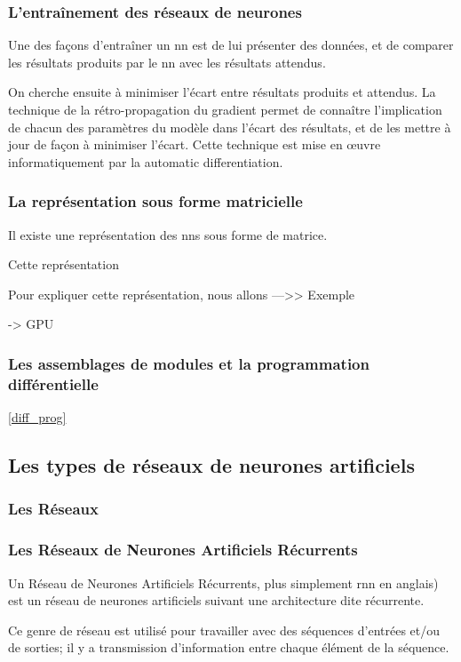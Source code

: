 \subsubsection{L'entraînement des réseaux de neurones}
Une des façons d'entraîner un \gls{nn} est de lui présenter des données, et de comparer les résultats produits par le \gls{nn} avec les résultats attendus.

On cherche ensuite à minimiser l'écart entre résultats produits et attendus.
La technique de la \og rétro-propagation du gradient\fg{} permet de connaître l'implication de chacun des paramètres du modèle dans l'écart des résultats, et de les mettre à jour de façon à minimiser l'écart.
Cette technique est mise en œuvre informatiquement par la \gls{automatic differentiation}. %

\subsubsection{La représentation sous forme matricielle}
\label{def:weight2}
Il existe une représentation des \glspl{nn} sous forme de matrice.

Cette représentation 

Pour expliquer cette représentation, nous allons
 --->> Exemple


-> GPU
\subsubsection{Les assemblages de modules et la programmation différentielle}
\autoref{diff_prog}


\subsection{Les types de réseaux de neurones artificiels}
\subsubsection{Les Réseaux }
\subsubsection{Les Réseaux de Neurones Artificiels Récurrents} \label{def:rnn}
Un Réseau de Neurones Artificiels Récurrents, plus simplement \gls{rnn} en anglais) est un réseau de neurones artificiels suivant une architecture dite récurrente.

Ce genre de réseau est utilisé pour travailler avec des séquences d'entrées 
et/ou de sorties; il y a transmission d'information entre chaque élément de 
la séquence. %

